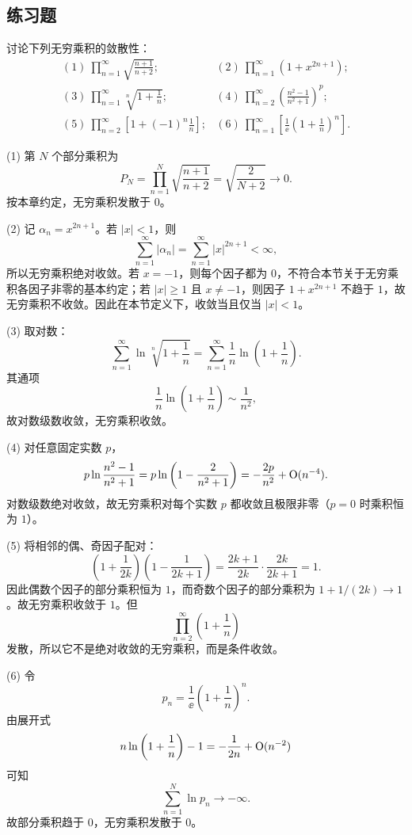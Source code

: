 \subsection{练习题}

\begin{xexercise}[1]
讨论下列无穷乘积的敛散性：
\[
\begin{array}{ll}
(1)\ \displaystyle\prod_{n=1}^{\infty}\sqrt{\frac{n+1}{n+2}};&
(2)\ \displaystyle\prod_{n=1}^{\infty}(1+x^{2n+1});\\[6pt]
(3)\ \displaystyle\prod_{n=1}^{\infty}\sqrt[n]{1+\frac1n};&
(4)\ \displaystyle\prod_{n=2}^{\infty}\left(\frac{n^2-1}{n^2+1}\right)^p;\\[6pt]
(5)\ \displaystyle\prod_{n=2}^{\infty}\left[1+(-1)^n\frac1n\right];&
(6)\ \displaystyle\prod_{n=1}^{\infty}\left[\frac1\ee\left(1+\frac1n\right)^n\right].
\end{array}
\]
\end{xexercise}
\begin{xsolution}
(1) 第 $N$ 个部分乘积为
\[
 P_N=\prod_{n=1}^{N}\sqrt{\frac{n+1}{n+2}}
 =\sqrt{\frac2{N+2}}\longrightarrow0.
\]
按本章约定，无穷乘积发散于 $0$。

(2) 记 $\alpha_n=x^{2n+1}$。若 $|x|<1$，则
\[
 \sum_{n=1}^{\infty}|\alpha_n|
 =\sum_{n=1}^{\infty}|x|^{2n+1}<\infty,
\]
所以无穷乘积绝对收敛。若 $x=-1$，则每个因子都为 $0$，不符合本节关于无穷乘积各因子非零的基本约定；若 $|x|\geq1$ 且 $x\neq-1$，则因子 $1+x^{2n+1}$ 不趋于 $1$，故无穷乘积不收敛。因此在本节定义下，收敛当且仅当 $|x|<1$。

(3) 取对数：
\[
 \sum_{n=1}^{\infty}\ln\sqrt[n]{1+\frac1n}
 =\sum_{n=1}^{\infty}\frac1n\ln\left(1+\frac1n\right).
\]
其通项
\[
 \frac1n\ln\left(1+\frac1n\right)
 \sim\frac1{n^2},
\]
故对数级数收敛，无穷乘积收敛。

(4) 对任意固定实数 $p$，
\[
 p\ln\frac{n^2-1}{n^2+1}
 =p\ln\left(1-\frac2{n^2+1}\right)
 =-\frac{2p}{n^2}+\mathrm{O}(n^{-4}).
\]
对数级数绝对收敛，故无穷乘积对每个实数 $p$ 都收敛且极限非零（$p=0$ 时乘积恒为 $1$）。

(5) 将相邻的偶、奇因子配对：
\[
 \left(1+\frac1{2k}\right)
 \left(1-\frac1{2k+1}\right)
 =\frac{2k+1}{2k}\cdot\frac{2k}{2k+1}=1.
\]
因此偶数个因子的部分乘积恒为 $1$，而奇数个因子的部分乘积为 $1+1/(2k)\to1$。故无穷乘积收敛于 $1$。但
\[
 \prod_{n=2}^{\infty}\left(1+\frac1n\right)
\]
发散，所以它不是绝对收敛的无穷乘积，而是条件收敛。

(6) 令
\[
 p_n=\frac1\ee\left(1+\frac1n\right)^n.
\]
由展开式
\[
 n\ln\left(1+\frac1n\right)-1
 =-\frac1{2n}+\mathrm{O}(n^{-2})
\]
可知
\[
 \sum_{n=1}^{N}\ln p_n\longrightarrow-\infty.
\]
故部分乘积趋于 $0$，无穷乘积发散于 $0$。
\end{xsolution}


